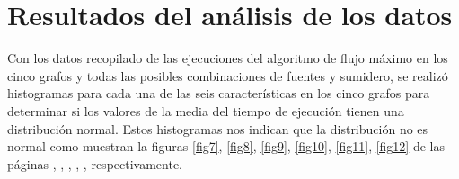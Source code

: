 \documentclass{article}
\begin{document}
\newpage
\section{Resultados del análisis de los datos}


Con los datos recopilado de las ejecuciones del algoritmo de flujo máximo en los cinco grafos y todas las posibles combinaciones de fuentes y sumidero, se realizó histogramas para cada una de las seis características en los cinco grafos para determinar si los valores de la media del tiempo de ejecución tienen una distribución normal. Estos histogramas nos indican que la distribución no es normal como muestran la figuras \ref{fig7}, \ref{fig8}, \ref{fig9}, \ref{fig10}, \ref{fig11}, \ref{fig12} de las páginas \pageref{fig7}, \pageref{fig8}, \pageref{fig9}, \pageref{fig10}, \pageref{fig11}, \pageref{fig12} respectivamente.  
\end{document}

